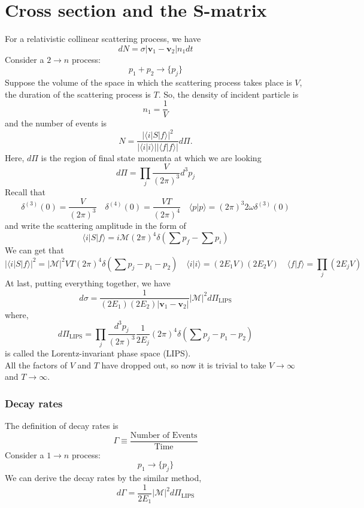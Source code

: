 \section{Cross section and the S-matrix}
\noindent
For a relativistic collinear scattering process, we have
\[dN = \sigma |\bm{v}_1 - \bm{v}_2| n_1 dt\]
Consider a  $2 \to n$ process:
\[p_1 + p_2 \to \{p_j\}\]
Suppose the volume of the space in which the scattering process takes place is $V$, the duration of the scattering process is $T$. 
So, the density of incident particle is
\[n_1 = \frac{1}{V}\]
and the number of events is
\[N = \frac{|\langle i | S | f \rangle|^2}{|\langle i | i \rangle||\langle f | f \rangle|} d\Pi .\]
Here, $d\Pi$ is the region of final state momenta at which we are looking
\[d\Pi = \prod_j \frac{V}{(2\pi)^3} d^3 p_j\]
Recall that
\[\delta^{(3)}(0) = \frac{V}{(2\pi)^3} \quad \delta^{(4)}(0) = \frac{VT}{(2\pi)^4} \quad \langle p | p \rangle = (2\pi)^3 2\omega \delta^{(3)}(0)\]
and write the scattering amplitude in the form of
\[\langle i | S | f \rangle = i\mathcal{M}(2\pi)^4\delta(\sum p_f-\sum p_i)\]
We can get that
\[|\langle i | S | f \rangle|^2 = |\mathcal{M}|^2 VT (2\pi)^4 \delta(\sum p_j - p_1 - p_2) \quad \langle i | i \rangle = (2E_1V) (2E_2V) \quad \langle f | f \rangle = \prod_j (2E_jV)\]
At last, putting everything together, we have
\[d\sigma = \frac{1}{(2E_1)(2E_2)|\bm{v}_1-\bm{v}_2|} |\mathcal{M}|^2 d\Pi_{\mathrm{LIPS}}\]
where,
\[d\Pi_{\mathrm{LIPS}} = \prod_j \frac{d^3p_j}{(2\pi)^3} \frac{1}{2E_j} (2\pi)^4 \delta(\sum p_j - p_1 - p_2)\]
is called the Lorentz-invariant phase space (LIPS). \\
All the factors of $V$ and $T$ have dropped out, so now it is trivial to take $V \to \infty$ and $T \to \infty$. 

\subsubsection{Decay rates}
\noindent
The definition of decay rates is
\[\Gamma \equiv \frac{\mbox{Number of Events}}{\mbox{Time}}\]
Consider a  $1 \to n$ process:
\[p_1 \to \{p_j\}\]
We can derive the decay rates by the similar method,
\[d\Gamma = \frac{1}{2E_1} |\mathcal{M}|^2 d\Pi_{\mathrm{LIPS}} \]

